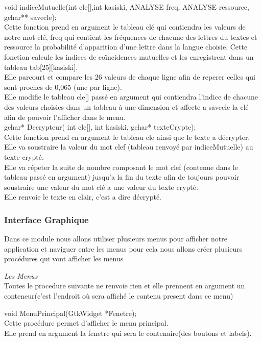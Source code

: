 \documentclass[a4]{article}
\begin{document}
	void indiceMutuelle(int cle[],int kasiski, ANALYSE freq, ANALYSE ressource, gchar** savecle);\\
		Cette fonction prend en argument le tableau clé qui contiendra les valeurs de notre mot clé,
		freq qui contient les fréquences de chacune des lettres du textes et ressource la
		probabilité d'apparition d'une lettre dans la langue choisie.
		Cette fonction calcule les indices de coïncidences mutuelles et les enregistrent dans un tableau tab[25][kasiski].\\
		Elle parcourt et compare les 26 valeurs de chaque ligne afin de reperer celles qui sont proches de 0,065
		(une par ligne).\\
		Elle modifie le tableau cle[] passé en argument qui contiendra l'indice de chacune des valeurs choisies dans un 
		tableau à une dimension et affecte a savecle la clé afin de pouvoir l'afficher dans le menu. \\
	
	gchar* Decrypteur( int cle[], int kasiski, gchar* texteCrypte);\\
		Cette fonction prend en argument le tableau cle ainsi que le texte a décrypter.
		Elle va soustraire la valeur du mot clef (tableau renvoyé par indiceMutuelle) au texte crypté.\\
		Elle va répeter la suite de nombre composant le mot clef (contenue dans le tableau passé en argument) jusqu'a
		la fin du texte afin de toujours pouvoir soustraire une valeur du mot clé a une valeur du texte crypté.\\
		Elle renvoie le texte en clair, c'est a dire décrypté.\\
		
		\subsubsection{Interface Graphique}
		Dans ce module nous allons utiliser plusieurs menus pour afficher notre application et naviguer 
		entre les menus pour cela nous allons créer plusieurs procédures qui vont afficher les menus  
		
		\textit{Les Menus}\\
		
		Toutes le procedure suivante ne renvoie rien et elle prennent en argument un conteneur(c'est l'endroit où sera affiché le contenu present dans ce menu)
		
	void MenuPrincipal(GtkWidget *Fenetre);\\
		Cette procédure permet d'afficher le menu principal.\\
		Elle prend en argument la fenetre qui sera le contenaire(des boutons et labels).\\
	
\end{document}

